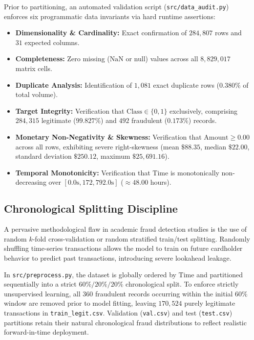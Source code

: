 \documentclass[11pt, a4paper]{article}
\begin{document}
Prior to partitioning, an automated validation script (\texttt{src/data\_audit.py}) enforces six programmatic data invariants via hard runtime assertions:
\begin{itemize}
    \item \textbf{Dimensionality \& Cardinality:} Exact confirmation of $284,807$ rows and $31$ expected columns.
    \item \textbf{Completeness:} Zero missing ($\text{NaN}$ or null) values across all $8,829,017$ matrix cells.
    \item \textbf{Duplicate Analysis:} Identification of $1,081$ exact duplicate rows ($0.380\%$ of total volume).
    \item \textbf{Target Integrity:} Verification that $\text{Class} \in \{0, 1\}$ exclusively, comprising $284,315$ legitimate ($99.827\%$) and $492$ fraudulent ($0.173\%$) records.
    \item \textbf{Monetary Non-Negativity \& Skewness:} Verification that $\text{Amount} \ge 0.00$ across all rows, exhibiting severe right-skewness (mean $\$88.35$, median $\$22.00$, standard deviation $\$250.12$, maximum $\$25,691.16$).
    \item \textbf{Temporal Monotonicity:} Verification that $\text{Time}$ is monotonically non-decreasing over $[0.0\text{s}, 172,792.0\text{s}]$ ($\approx 48.00$ hours).
\end{itemize}

\subsection{Chronological Splitting Discipline}
A pervasive methodological flaw in academic fraud detection studies is the use of random $k$-fold cross-validation or random stratified train/test splitting. Randomly shuffling time-series transactions allows the model to train on future cardholder behavior to predict past transactions, introducing severe lookahead leakage.

In \texttt{src/preprocess.py}, the dataset is globally ordered by $\text{Time}$ and partitioned sequentially into a strict $60\% / 20\% / 20\%$ chronological split. To enforce strictly unsupervised learning, all $360$ fraudulent records occurring within the initial $60\%$ window are removed prior to model fitting, leaving $170,524$ purely legitimate transactions in \texttt{train\_legit.csv}. Validation (\texttt{val.csv}) and test (\texttt{test.csv}) partitions retain their natural chronological fraud distributions to reflect realistic forward-in-time deployment.
\end{document}
